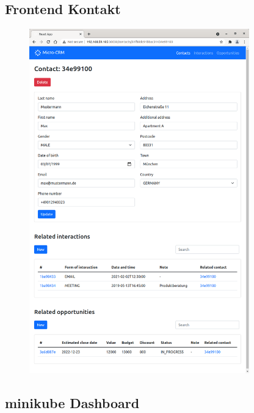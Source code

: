 \clearpage
\subsection*{Frontend Kontakt}

\begin{figure}[H] 
    \centering
    \includegraphics[width=0.85\textwidth]{figures/FrontendKontakt.png}
\end{figure}

\clearpage
\subsection*{minikube Dashboard}

